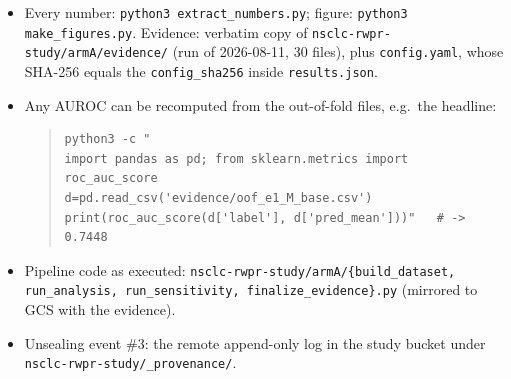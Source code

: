 \documentclass[11pt,a4paper]{article}
\begin{document}
\begin{itemize}[leftmargin=1.2em,itemsep=1pt]
\item Every number: \texttt{python3 extract\_numbers.py}; figure:
\texttt{python3 make\_figures.py}. Evidence: verbatim copy of
\texttt{nsclc-rwpr-study/armA/evidence/} (run of 2026-08-11, 30 files), plus
\texttt{config.yaml}, whose SHA-256 equals the \texttt{config\_sha256} inside
\texttt{results.json}.
\item Any AUROC can be recomputed from the out-of-fold files, e.g.\ the headline:
\begin{quote}\small\begin{verbatim}
python3 -c "
import pandas as pd; from sklearn.metrics import roc_auc_score
d=pd.read_csv('evidence/oof_e1_M_base.csv')
print(roc_auc_score(d['label'], d['pred_mean']))"   # -> 0.7448
\end{verbatim}\end{quote}
\item Pipeline code as executed: \texttt{nsclc-rwpr-study/armA/\{build\_dataset, run\_analysis,
run\_sensitivity, finalize\_evidence\}.py} (mirrored to GCS with the evidence).
\item Unsealing event \#3: the remote append-only log in the study bucket under\\
\texttt{nsclc-rwpr-study/\_provenance/}.
\end{itemize}
\end{document}
